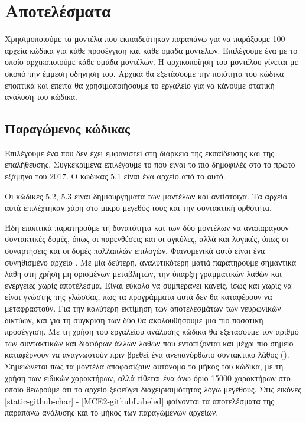 \section{Αποτελέσματα}

Χρησιμοποιούμε τα μοντέλα που εκπαιδεύτηκαν παραπάνω για να παράξουμε 100 αρχεία κώδικα για κάθε προσέγγιση και κάθε ομάδα μοντέλων.
Επιλέγουμε ένα  με το οποίο αρχικοποιούμε κάθε ομάδα μοντέλων. 
Η αρχικοποίηση του μοντέλου γίνεται με σκοπό την έμμεση οδήγηση του.
Αρχικά θα εξετάσουμε την ποιότητα του κώδικα εποπτικά και έπειτα θα χρησιμοποιήσουμε το εργαλείο  για να κάνουμε στατική ανάλυση του κώδικα.

\subsection{ Παραγώμενος κώδικας}

Επιλέγουμε ένα  που δεν έχει εμφανιστεί στη διάρκεια της εκπαίδευσης και της επαλήθευσης.
Συγκεκριμένα επιλέγουμε το  που είναι το πιο δημοφιλές  στο  το πρώτο εξάμηνο του 2017.
Ο κώδικας 5.1 είναι ένα αρχείο από το  αυτό.



Οι κώδικες 5.2, 5.3 είναι δημιουργήματα των μοντέλων  και  αντίστοιχα. Τα αρχεία αυτά επιλέχτηκαν χάρη στο μικρό μέγεθός τους και την συντακτική ορθότητα.



Ήδη εποπτικά παρατηρούμε τη δυνατότητα και των δύο μοντέλων να αναπαράγουν συντακτικές δομές, όπως οι παρενθέσεις και οι αγκύλες, αλλά και λογικές, όπως οι συναρτήσεις και οι δομές πολλαπλών επιλογών.
Φαινομενικά αυτό είναι ένα συνηθισμένο αρχείο .
Με μία δεύτερη, αναλυτικότερη ματιά παρατηρούμε σημαντικά λάθη στη χρήση μη ορισμένων μεταβλητών, την ύπαρξη γραμματικών λαθών και ενέργειες χωρίς αποτέλεσμα. 
Είναι εύκολο να συμπεράνει κανείς, ίσως και χωρίς να είναι γνώστης της γλώσσας, πως τα προγράμματα αυτά δεν θα καταφέρουν να μεταφραστούν. 
Για την καλύτερη εκτίμηση των αποτελεσμάτων των νευρωνικών δικτύων, και για τη σύγκριση των δύο  θα ακολουθήσουμε μια πιο ποσοτική προσέγγιση. 
Με τη χρήση του εργαλείου ανάλυσης κώδικα  θα εξετάσουμε τον αριθμό των συντακτικών και διαφόρων άλλων λαθών  που εντοπίζονται και μέχρι πιο σημείο καταφέρνουν να αναγνωστούν πριν βρεθεί ένα ανεπανόρθωτο συντακτικό λάθος ().
Σημειώνεται πως τα μοντέλα αποφασίζουν αυτόνομα το μήκος του κώδικα, με τη χρήση των ειδικών χαρακτήρων, αλλά τίθεται ένα άνω όριο 15000 χαρακτήρων στο οποίο θεωρούμε ότι το αρχείο ξεφεύγει διαχειρισιμότητας λόγω μεγέθους.
Στις εικόνες \ref{static-github-char} - \ref{MCE2-githubLabeled} φαίνονται τα αποτελέσματα της παραπάνω ανάλυσης και το μήκος των παραγώμενων αρχείων.

